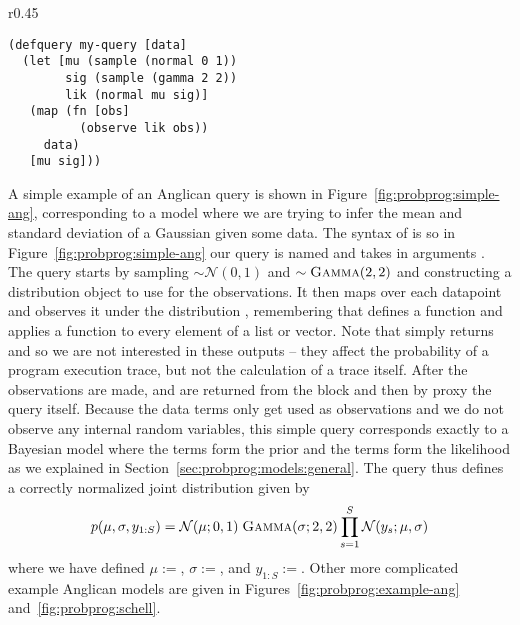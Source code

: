 \begin{wrapfigure}{r}{0.45\textwidth}
	\centering 
	\vspace{-10pt}
	\begin{lstlisting}[basicstyle=\ttfamily\small]
(defquery my-query [data]
  (let [mu (sample (normal 0 1))
        sig (sample (gamma 2 2))
        lik (normal mu sig)]
   (map (fn [obs]
          (observe lik obs))
     data)
   [mu sig]))
	\end{lstlisting}	
	\vspace{-5pt}
	\caption{A simple Anglican query.\label{fig:probprog:simple-ang}}
	\vspace{-10pt}
\end{wrapfigure}
A simple example of an Anglican query is shown in Figure~\ref{fig:probprog:simple-ang},
corresponding to a model where we are trying to infer the mean and standard deviation
of a Gaussian given some data.  The syntax of  is {\small {}}
so in Figure~\ref{fig:probprog:simple-ang} our query is named {\small {}} and takes
in arguments {\small {}}.  The query starts by sampling {\small {}}$\sim\mathcal{N}(0,1)$
and {\small {}}$\sim\textsc{Gamma}(2,2)$ and constructing a distribution object {\small {}}
to use for the observations.  It then maps over each datapoint and observes it under the distribution
{\small {}}, remembering that {\small {}} defines a function and \map applies a function
to every element of a list or vector.  
Note that \observe simply returns {\small {}} and so we
are not interested in these outputs -- they affect the probability of a program execution trace, but
not the calculation of a trace itself.  After the observations are made, {\small {}} and {\small {}}
are returned from the \cllet block and then by proxy the query itself.
Because the data terms only get used as observations and we do
not observe any internal random variables, this simple query corresponds exactly to a Bayesian model where
the \sample terms form the prior and the \observe terms form the likelihood as we explained in
Section~\ref{sec:probprog:models:general}.  The query thus defines a correctly normalized joint
distribution given by
\begin{align}
p(\mu,\sigma,y_{1:S}) = \mathcal{N}(\mu ; 0,1) \; \textsc{Gamma}(\sigma ; 2, 2) \prod_{s=1}^{S} \mathcal{N}(y_s ; \mu, \sigma)
\end{align}
where we have defined $\mu:=${\small {}}, $\sigma:=${\small {}}, and $y_{1:S}:=${\small {}}.
Other more complicated example Anglican models are given in Figures~\ref{fig:probprog:example-ang}
and~\ref{fig:probprog:schell}.

